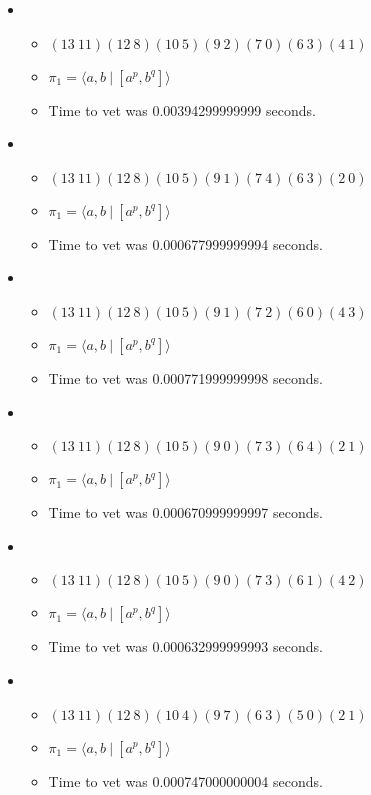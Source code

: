 \documentclass{article}
\begin{document}
\begin{itemize}
\begin{itemize}
\end{itemize}
\item \begin{itemize}
      \item $(13\ 11)(12\ 8)(10\ 5)(9\ 2)(7\ 0)(6\ 3)(4\ 1)$
      \item $\pi_1 = \langle a,b\ |\ [a^p,b^q]\rangle$
      \item Time to vet was 0.00394299999999 seconds.
\end{itemize}
\item \begin{itemize}
      \item $(13\ 11)(12\ 8)(10\ 5)(9\ 1)(7\ 4)(6\ 3)(2\ 0)$
      \item $\pi_1 = \langle a,b\ |\ [a^p,b^q]\rangle$
      \item Time to vet was 0.000677999999994 seconds.
\end{itemize}
\item \begin{itemize}
      \item $(13\ 11)(12\ 8)(10\ 5)(9\ 1)(7\ 2)(6\ 0)(4\ 3)$
      \item $\pi_1 = \langle a,b\ |\ [a^p,b^q]\rangle$
      \item Time to vet was 0.000771999999998 seconds.
\end{itemize}
\item \begin{itemize}
      \item $(13\ 11)(12\ 8)(10\ 5)(9\ 0)(7\ 3)(6\ 4)(2\ 1)$
      \item $\pi_1 = \langle a,b\ |\ [a^p,b^q]\rangle$
      \item Time to vet was 0.000670999999997 seconds.
\end{itemize}
\item \begin{itemize}
      \item $(13\ 11)(12\ 8)(10\ 5)(9\ 0)(7\ 3)(6\ 1)(4\ 2)$
      \item $\pi_1 = \langle a,b\ |\ [a^p,b^q]\rangle$
      \item Time to vet was 0.000632999999993 seconds.
\end{itemize}
\item \begin{itemize}
      \item $(13\ 11)(12\ 8)(10\ 4)(9\ 7)(6\ 3)(5\ 0)(2\ 1)$
      \item $\pi_1 = \langle a,b\ |\ [a^p,b^q]\rangle$
      \item Time to vet was 0.000747000000004 seconds.

\end{itemize}
\end{itemize}
\end{document}
